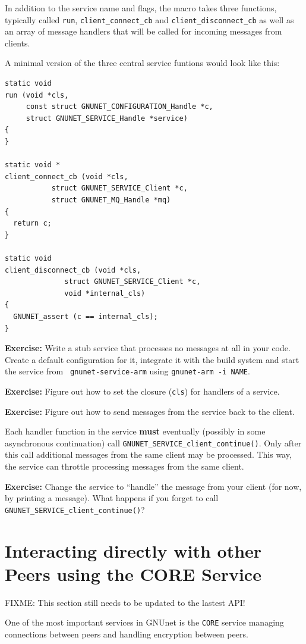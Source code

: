 \documentclass[10pt]{article}
\newcommand{\exercise}[1]{\noindent\begin{boxedminipage}{\textwidth}{\bf Exercise:} #1 \end{boxedminipage}}
\begin{document}
In addition to the service name and flags, the macro takes three
functions, typically called {\tt run}, {\tt client\_connect\_cb} and
{\tt client\_disconnect\_cb} as well as an array of message handlers
that will be called for incoming messages from clients.

A minimal version of the three central service funtions would look
like this:

\lstset{language=c}
\begin{lstlisting}
static void
run (void *cls,
     const struct GNUNET_CONFIGURATION_Handle *c,
     struct GNUNET_SERVICE_Handle *service)
{
}

static void *
client_connect_cb (void *cls,
		   struct GNUNET_SERVICE_Client *c,
		   struct GNUNET_MQ_Handle *mq)
{
  return c;
}

static void
client_disconnect_cb (void *cls,
		      struct GNUNET_SERVICE_Client *c,
		      void *internal_cls)
{
  GNUNET_assert (c == internal_cls);
}
\end{lstlisting}

\exercise{Write a stub service that processes no messages at all
  in your code.  Create a default configuration for it, integrate it
  with the build system and start the service from {\tt
  gnunet-service-arm} using {\tt gnunet-arm -i NAME}.}

\exercise{Figure out how to set the closure ({\tt cls}) for handlers
  of a service.}

\exercise{Figure out how to send messages from the service back to the
  client.}

Each handler function in the service {\bf must} eventually (possibly in some
asynchronous continuation) call {\tt GNUNET\_SERVICE\_client\_continue()}.
Only after this call additional messages from the same client may
be processed. This way, the service can throttle processing messages
from the same client.

\exercise{Change the service to ``handle'' the message from your
  client (for now, by printing a message).  What happens if you
  forget to call {\tt GNUNET\_SERVICE\_client\_continue()}?}


\section{Interacting directly with other Peers using the CORE Service}

FIXME: This section still needs to be updated to the lastest API!

One of the most important services in GNUnet is the \texttt{CORE} service
managing connections between peers and handling encryption between peers.
\end{document}
